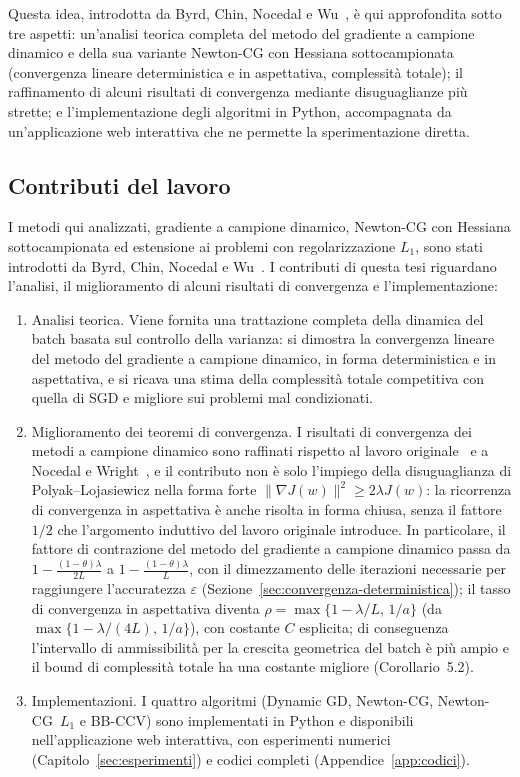 \documentclass[a4paper,12pt]{article}
\numberwithin{equation}{section}
\numberwithin{figure}{section}
\numberwithin{table}{section}
\begin{document}
Questa idea, introdotta da Byrd, Chin, Nocedal e Wu~\cite{byrd2012}, è qui
approfondita sotto tre aspetti: un'analisi teorica completa del metodo del
gradiente a campione dinamico e della sua variante Newton-CG con Hessiana
sottocampionata (convergenza lineare deterministica e in aspettativa,
complessità totale); il raffinamento di alcuni risultati di convergenza
mediante disuguaglianze più strette; e l'implementazione degli algoritmi in
Python, accompagnata da un'applicazione web interattiva che ne permette la
sperimentazione diretta.

\subsection{Contributi del lavoro}

I metodi qui analizzati, gradiente a campione dinamico, Newton-CG con
Hessiana sottocampionata ed estensione ai problemi con regolarizzazione
$L_1$, sono stati introdotti da Byrd, Chin, Nocedal e Wu~\cite{byrd2012}.
I contributi di questa tesi riguardano l'analisi, il miglioramento di alcuni
risultati di convergenza e l'implementazione:

\begin{enumerate}
  \item Analisi teorica. Viene fornita una trattazione completa della
  dinamica del batch basata sul controllo della varianza: si dimostra la
  convergenza lineare del metodo del gradiente a campione dinamico, in forma
  deterministica e in aspettativa, e si ricava una stima della complessità
  totale competitiva con quella di SGD e migliore sui problemi mal
  condizionati.
  \item Miglioramento dei teoremi di convergenza. I risultati di convergenza
  dei metodi a campione dinamico sono raffinati rispetto al lavoro
  originale~\cite{byrd2012} e a Nocedal e Wright~\cite{nocedal2006}, e il
  contributo non è solo l'impiego della disuguaglianza di Polyak--Lojasiewicz
  nella forma forte $\|\nabla J(w)\|^2 \ge 2\lambda J(w)$: la ricorrenza di
  convergenza in aspettativa è anche risolta in forma chiusa, senza il fattore
  $1/2$ che l'argomento induttivo del lavoro originale introduce. In
  particolare, il fattore di contrazione del metodo del gradiente a campione
  dinamico passa da $1-\frac{(1-\theta)\lambda}{2L}$ a
  $1-\frac{(1-\theta)\lambda}{L}$, con il dimezzamento delle iterazioni
  necessarie per raggiungere l'accuratezza $\varepsilon$
  (Sezione~\ref{sec:convergenza-deterministica}); il tasso di convergenza in
  aspettativa diventa $\rho = \max\{1-\lambda/L,\, 1/a\}$ (da
  $\max\{1-\lambda/(4L),\, 1/a\}$), con costante $C$ esplicita; di conseguenza
  l'intervallo di ammissibilità per la crescita geometrica del batch è più
  ampio e il bound di complessità totale ha una costante migliore
  (Corollario~5.2).
  \item Implementazioni. I quattro algoritmi (Dynamic GD, Newton-CG,
  Newton-CG~$L_1$ e BB-CCV) sono implementati in Python e disponibili
  nell'applicazione web interattiva, con esperimenti numerici
  (Capitolo~\ref{sec:esperimenti}) e codici completi (Appendice~\ref{app:codici}).
\end{enumerate}
\end{document}
